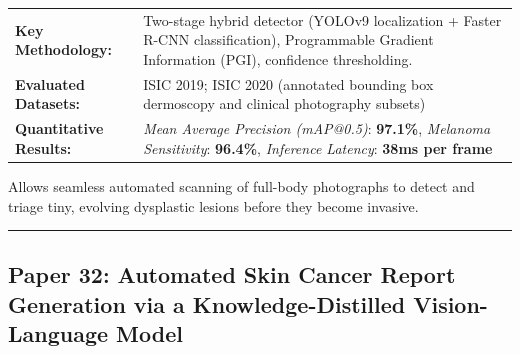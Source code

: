 \documentclass[10pt,a4paper]{article}
\begin{document}
\vspace{4pt}
\begin{tabularx}{\linewidth}{p{3.2cm}X}
\toprule
\textbf{Key Methodology:} & Two-stage hybrid detector (YOLOv9 localization + Faster R-CNN classification), Programmable Gradient Information (PGI), confidence thresholding. \\
\textbf{Evaluated Datasets:} & ISIC 2019; ISIC 2020 (annotated bounding box dermoscopy and clinical photography subsets) \\
\textbf{Quantitative Results:} & \textit{Mean Average Precision (mAP@0.5)}: \textbf{97.1\%}, \textit{Melanoma Sensitivity}: \textbf{96.4\%}, \textit{Inference Latency}: \textbf{38ms per frame} \\
\bottomrule
\end{tabularx}
\vspace{4pt}
\begin{tcolorbox}[utilitybox,title=Clinical Utility and Real-World Impact]
Allows seamless automated scanning of full-body photographs to detect and triage tiny, evolving dysplastic lesions before they become invasive.
\end{tcolorbox}
\vspace{12pt}
\hrule
\vspace{12pt}
\subsection*{Paper 32: Automated Skin Cancer Report Generation via a Knowledge-Distilled Vision-Language Model}
\end{document}
